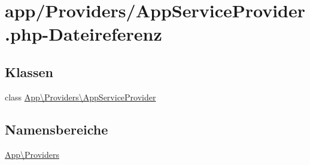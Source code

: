 \hypertarget{AppServiceProvider_8php}{}\section{app/\+Providers/\+App\+Service\+Provider.php-\/\+Dateireferenz}
\label{AppServiceProvider_8php}
\subsection*{Klassen}
\begin{DoxyCompactItemize}
\item 
class \hyperlink{classApp_1_1Providers_1_1AppServiceProvider}{App\textbackslash{}\+Providers\textbackslash{}\+App\+Service\+Provider}
\end{DoxyCompactItemize}
\subsection*{Namensbereiche}
\begin{DoxyCompactItemize}
\item 
 \hyperlink{namespaceApp_1_1Providers}{App\textbackslash{}\+Providers}
\end{DoxyCompactItemize}
